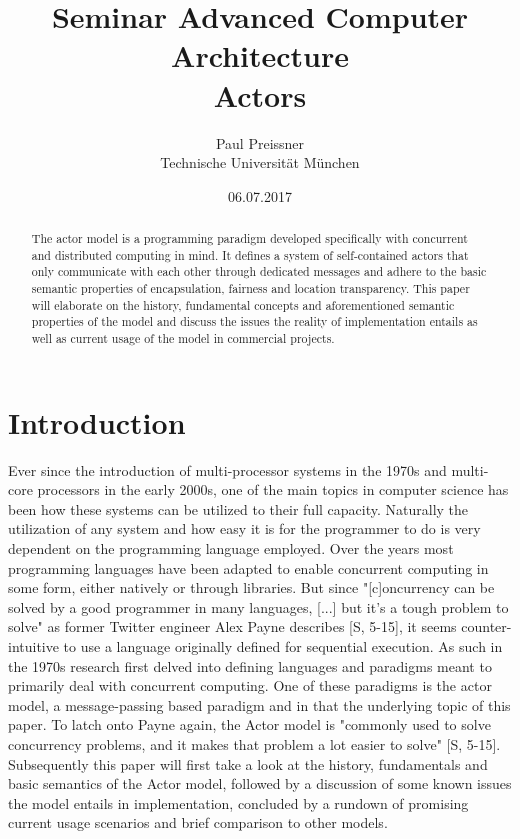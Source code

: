 \documentclass[A4]{article}
\author{Paul Preissner \\ Technische Universit\"at M\"unchen}
\title{Seminar Advanced Computer Architecture \\
       {\bf Actors}
}
\date{06.07.2017}
\begin{document}
\maketitle

\begin{abstract}
The actor model is a programming paradigm developed specifically with concurrent and distributed computing in mind. It defines a system of self-contained actors that only communicate with each other through dedicated messages and adhere to the basic semantic properties of encapsulation, fairness and location transparency. 
This paper will elaborate on the history, fundamental concepts and aforementioned semantic properties of the model and discuss the issues the reality of implementation entails as well as current usage of the model in commercial projects. 
\end{abstract}

\section{Introduction}
\label{introduction}
Ever since the introduction of multi-processor systems in the 1970s and multi-core processors in the early 2000s, one of the main topics in computer science has been how these systems can be utilized to their full capacity. Naturally the utilization of any system and how easy it is for the programmer to do is very dependent on the programming language employed. 
Over the years most programming languages have been adapted to enable concurrent computing in some form, either natively or through libraries. But since "[c]oncurrency can be solved by a good programmer in many languages, [...] but it's a tough problem to solve" as former Twitter engineer Alex Payne describes [S, 5-15], it seems counter-intuitive to use a language originally defined for sequential execution. As such in the 1970s research first delved into defining languages and paradigms meant to primarily deal with concurrent computing. One of these paradigms is the actor model, a message-passing based paradigm and in that the underlying topic of this paper. To latch onto Payne again, the Actor model is "commonly used to solve concurrency problems, and it makes that problem a lot easier to solve" [S, 5-15].
Subsequently this paper will first take a look at the history, fundamentals and basic semantics of the Actor model, followed by a discussion of some known issues the model entails in implementation, concluded by a rundown of promising current usage scenarios and brief comparison to other models. 
\end{document}
